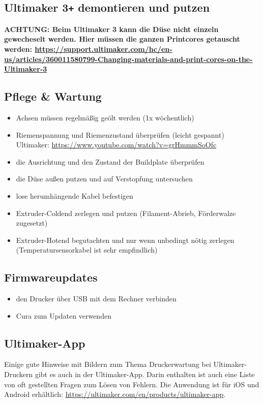 \documentclass{\basedir/fablab-document}
\begin{document}
\subsection{Ultimaker 3\texttt{+} demontieren und putzen}

\textbf{ACHTUNG: Beim Ultimaker 3 kann die Düse nicht einzeln gewecheselt werden. Hier müssen die ganzen Printcores getauscht werden: \url{https://support.ultimaker.com/hc/en-us/articles/360011580799-Changing-materials-and-print-cores-on-the-Ultimaker-3}}


\subsection{Pflege \& Wartung}

\begin{itemize}
\item Achsen müssen regelmäßig geölt werden (1x wöchentlich)
\item Riemenspannung und Riemenzustand überprüfen (leicht gespannt)\\
Ultimaker: \url{https://www.youtube.com/watch?v=grHmmmSoOfc}
\item die Ausrichtung und den Zustand der Buildplate überprüfen
\item die Düse außen putzen und auf Verstopfung untersuchen
\item lose herumhängende Kabel befestigen
\item Extruder-Coldend zerlegen und putzen (Filament-Abrieb, Förderwalze zugesetzt)
\item Extruder-Hotend begutachten und nur wenn unbedingt nötig zerlegen (Temperatursensorkabel ist sehr empfindlich)
\end{itemize}

\subsection{Firmwareupdates}

\begin{itemize}
\item den Drucker über USB mit dem Rechner verbinden
\item Cura zum Updaten verwenden
\end{itemize}

\subsection{Ultimaker-App}

Einige gute Hinweise mit Bildern zum Thema Druckerwartung bei Ultimaker-Druckern gibt es auch in der Ultimaker-App.
Darin enthalten ist auch eine Liste von oft gestellten Fragen zum Lösen von Fehlern.
Die Anwendung ist für iOS und Android erhältlich: \url{https://ultimaker.com/en/products/ultimaker-app}.
\end{document}
